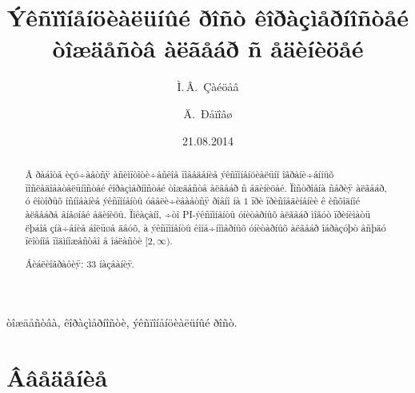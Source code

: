 \documentclass{article}
\numberwithin{equation}{section}
\theoremstyle{plain}
\theoremstyle{definition}
\begin{document}
\title{Ýêñïîíåíöèàëüíûé ðîñò êîðàçìåðíîñòåé òîæäåñòâ àëãåáð ñ åäèíèöåé}
\author[M.\,V.~Zaicev]{Ì.\,Â.~Çàéöåâ}
\address{ÌÃÓ èìåíè~Ì.\,Â.~Ëîìîíîñîâà}
\author[D.~Repov\v s]{Ä.~Ðåïîâø}
\address{Óíèâåðñèòåò Ëþáëÿíû, Ñëîâåíèÿ}

\date{21.08.2014}

\maketitle

\begin{fulltext}

\begin{abstract}
Â ðàáîòå èçó÷àåòñÿ àñèìïòîòè÷åñêîå ïîâåäåíèå ýêñïîíåíöèàëüíî îãðàíè÷åííûõ ïîñëåäîâàòåëüíîñòåé
êîðàçìåðíîñòåé òîæäåñòâ àëãåáð ñ åäèíèöåé. Ïîñòðîåíà ñåðèÿ àëãåáð, ó êîòîðûõ îñíîâàíèå
ýêñïîíåíòû óâåëè÷èâàåòñÿ ðîâíî íà $1$ ïðè ïðèñîåäèíåíèè ê èñõîäíîé àëãåáðå âíåøíåé
åäèíèöû. Ïîêàçàíî, ÷òî PI-ýêñïîíåíòû óíèòàðíûõ àëãåáð ìîãóò ïðèíèìàòü ëþáîå çíà÷åíèå
áîëüøå äâóõ, à ýêñïîíåíòû êîíå÷íîìåðíûõ óíèòàðíûõ àëãåáð îáðàçóþò âñþäó ïëîòíîå
ïîäìíîæåñòâî â îáëàñòè $[2,\infty)$.

Áèáëèîãðàôèÿ: 33 íàçâàíèÿ.
\end{abstract}

\begin{keywords} 
òîæäåñòâà, êîðàçìåðíîñòè, ýêñïîíåíöèàëüíûé ðîñò. 
\end{keywords}



\section{Ââåäåíèå}\label{s1}


\end{fulltext}
\end{document}
